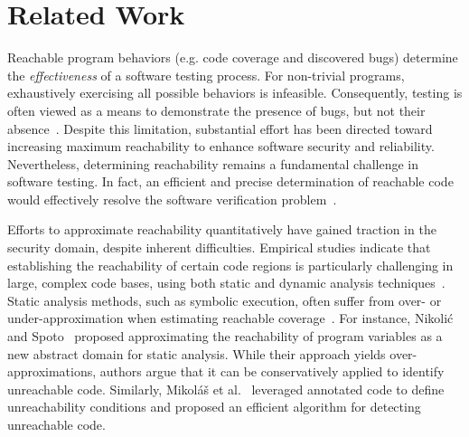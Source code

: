\documentclass[conference,anonymous,review]{IEEEtran}
\begin{document}
\section{Related Work}
\label{sec:related}

Reachable program behaviors (e.g. code coverage and discovered bugs) determine the \emph{effectiveness} of a software testing process. For non-trivial programs, exhaustively exercising all possible behaviors is infeasible. Consequently, testing is often viewed as a means to demonstrate the presence of bugs, but not their absence~\cite{dijkstra2022reliability}. Despite this limitation, substantial effort has been directed toward increasing maximum reachability to enhance software security and reliability. Nevertheless, determining reachability remains a fundamental challenge in software testing. In fact, an efficient and precise determination of reachable code would effectively resolve the software verification problem~\cite{liyanage2023reachable}. 

Efforts to approximate reachability quantitatively have gained traction in the security domain, despite inherent difficulties. Empirical studies indicate that establishing the reachability of certain code regions is particularly challenging in large, complex code bases, using both static and dynamic analysis techniques~\cite{latoza2010developers}. Static analysis methods, such as symbolic execution, often suffer from over- or under-approximation when estimating reachable coverage~\cite{liyanage2023reachable,aniche2015why}. For instance, Nikoli\'{c} and Spoto~\cite{nikolic2013reachability} proposed approximating the reachability of program variables as a new abstract domain for static analysis. While their approach yields over-approximations, authors argue that it can be conservatively applied to identify unreachable code. Similarly, Mikol\'{a}\v{s} et al.~\cite{janota2007reachability} leveraged annotated code to define unreachability conditions and proposed an efficient algorithm for detecting unreachable code.
\end{document}

